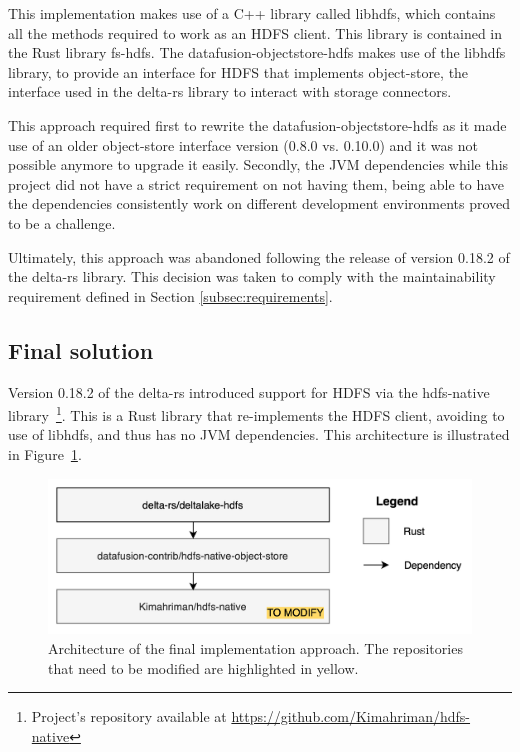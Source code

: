 This implementation makes use of a C++ library called libhdfs, which contains all the methods required to work as an \gls{HDFS} client. This library is contained in the Rust library fs-hdfs. The datafusion-objectstore-hdfs makes use of the libhdfs library, to provide an interface for \gls{HDFS} that implements object-store, the interface used in the delta-rs library to interact with storage connectors.

This approach required first to rewrite the datafusion-objectstore-hdfs as it made use of an older object-store interface version (0.8.0 vs. 0.10.0) and it was not possible anymore to upgrade it easily. Secondly, the \gls{JVM} dependencies while this project did not have a strict requirement on not having them, being able to have the dependencies consistently work on different development environments proved to be a challenge. 

Ultimately, this approach was abandoned following the release of version 0.18.2 of the delta-rs library. This decision was taken to comply with the maintainability requirement defined in Section \ref{subsec:requirements}.

\subsection{Final solution}

Version 0.18.2 of the delta-rs introduced support for \gls{HDFS} via the hdfs-native library~\footnote{Project's repository available at \url{https://github.com/Kimahriman/hdfs-native}}. This is a Rust library that re-implements the \gls{HDFS} client, avoiding to use of libhdfs, and thus has no \gls{JVM} dependencies. This architecture is illustrated in Figure~\ref{fig:approach_2_solution_schema}.

\begin{figure}[!ht]
  \begin{center}
    \includegraphics[width=\textwidth]{figures/4-implementation/hdfs-native.png}
  \caption[Final solution architecture]{Architecture of the final implementation approach. The repositories that need to be modified are highlighted in yellow.}
  \label{fig:approach_2_solution_schema}
  \end{center}
\end{figure}

